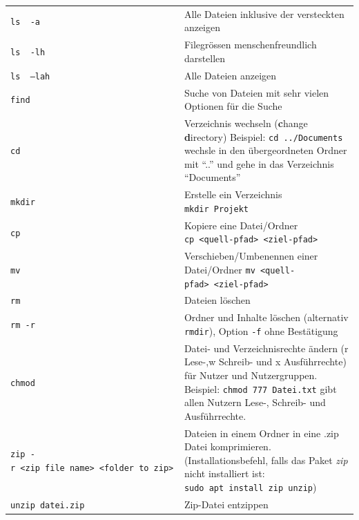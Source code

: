 \documentclass[
  11pt,
  a4paperpaper,
  oneside, openany  ,captions=tableheading
]{scrbook}
\theoremstyle{definition}
\theoremstyle{remark}
\begin{document}
\begin{longtable}[]{@{}
  >{\raggedright\arraybackslash}p{}
  >{\raggedright\arraybackslash}p{}@{}}
\texttt{ls\ \ -a} & Alle Dateien inklusive der versteckten anzeigen \\
\texttt{ls\ \ -lh} & Filegrössen menschenfreundlich darstellen \\
\texttt{ls\ \ –lah} & Alle Dateien anzeigen \\
\texttt{find} & Suche von Dateien mit sehr vielen Optionen für die
Suche \\
\texttt{cd} & Verzeichnis wechseln (\textbf{c}hange \textbf{d}irectory)
Beispiel: \texttt{cd\ ../Documents} wechsle in den übergeordneten Ordner
mit ``..'' und gehe in das Verzeichnis ``Documents'' \\
\texttt{mkdir} & Erstelle ein Verzeichnis \texttt{mkdir\ Projekt} \\
\texttt{cp} & Kopiere eine Datei/Ordner
\texttt{cp\ \textless{}quell-pfad\textgreater{}\ \textless{}ziel-pfad\textgreater{}} \\
\texttt{mv} & Verschieben/Umbenennen einer Datei/Ordner
\texttt{mv\ \textless{}quell-pfad\textgreater{}\ \textless{}ziel-pfad\textgreater{}} \\
\texttt{rm} & Dateien löschen \\
\texttt{rm\ -r} & Ordner und Inhalte löschen (alternativ
\texttt{rmdir}), Option \texttt{-f} ohne Bestätigung \\
\texttt{chmod} & Datei- und Verzeichnisrechte ändern (r Lese-,w Schreib-
und x Ausführrechte) für Nutzer und Nutzergruppen. Beispiel:
\texttt{chmod\ 777\ Datei.txt} gibt allen Nutzern Lese-, Schreib- und
Ausführrechte. \\
\texttt{zip\ -r\ \textless{}zip\ file\ name\textgreater{}\ \textless{}folder\ to\ zip\textgreater{}}
& Dateien in einem Ordner in eine .zip Datei komprimieren.
(Installationsbefehl, falls das Paket \emph{zip} nicht installiert ist:
\texttt{sudo\ apt\ install\ zip\ unzip}) \\
\texttt{unzip\ datei.zip} & Zip-Datei entzippen \\
\end{longtable}
\end{document}
